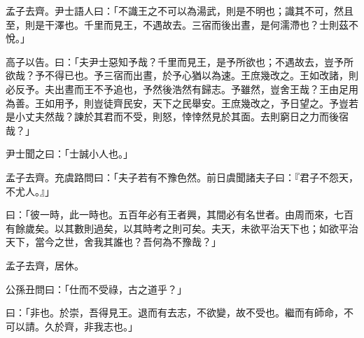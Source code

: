 \documentclass[12pt,a4paper]{ctexbook}
\begin{document}
孟子去齊。尹士語人曰：「不識王之不可以為湯武，則是不明也；識其不可，然且至，則是干澤也。千里而見王，不遇故去。三宿而後出晝，是何濡滯也？士則茲不悅。」\par
高子以告。曰：「夫尹士惡知予哉？千里而見王，是予所欲也；不遇故去，豈予所欲哉？予不得已也。予三宿而出晝，於予心猶以為速。王庶幾改之。王如改諸，則必反予。夫出晝而王不予追也，予然後浩然有歸志。予雖然，豈舍王哉？王由足用為善。王如用予，則豈徒齊民安，天下之民舉安。王庶幾改之，予日望之。予豈若是小丈夫然哉？諫於其君而不受，則怒，悻悻然見於其面。去則窮日之力而後宿哉？」\par
尹士聞之曰：「士誠小人也。」\par
孟子去齊。充虞路問曰：「夫子若有不豫色然。前日虞聞諸夫子曰：『君子不怨天，不尤人。』」\par
曰：「彼一時，此一時也。五百年必有王者興，其間必有名世者。由周而來，七百有餘歲矣。以其數則過矣，以其時考之則可矣。夫天，未欲平治天下也；如欲平治天下，當今之世，舍我其誰也？吾何為不豫哉？」\par
孟子去齊，居休。\par
公孫丑問曰：「仕而不受祿，古之道乎？」\par
曰：「非也。於崇，吾得見王。退而有去志，不欲變，故不受也。繼而有師命，不可以請。久於齊，非我志也。」\par
\end{document}
